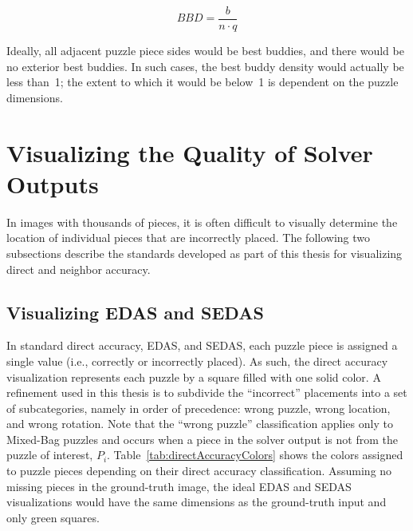 \begin{equation} \label{eq:bestBuddyDensity}
    BBD = \frac{b}{n \cdot q}
\end{equation}

Ideally, all adjacent puzzle piece sides would be best buddies, and there would be no exterior best buddies. In such cases, the best buddy density would actually be less than~1; the extent to which it would be below~1 is dependent on the puzzle dimensions. 

\section{Visualizing the Quality of Solver Outputs}\label{sec:visualizingSolverAccuracy}

In images with thousands of pieces, it is often difficult to visually determine the location of individual pieces that are incorrectly placed.  The following two subsections describe the standards developed as part of this thesis for visualizing direct and neighbor accuracy.

\subsection{Visualizing EDAS and SEDAS}\label{sec:visualizingEdasSedas}

In standard direct accuracy, EDAS, and SEDAS, each puzzle piece is assigned a single value (i.e., correctly or incorrectly placed).  As such, the direct accuracy visualization represents each puzzle by a square filled with one solid color.  A refinement used in this thesis is to subdivide the ``incorrect'' placements into a set of subcategories, namely in order of precedence: wrong puzzle, wrong location, and wrong rotation.  Note that the ``wrong puzzle'' classification applies only to Mixed-Bag puzzles and occurs when a piece in the solver output is not from the puzzle of interest, $P_i$.  Table~\ref{tab:directAccuracyColors} shows the colors assigned to puzzle pieces depending on their direct accuracy classification.  Assuming no missing pieces in the ground-truth image, the ideal EDAS and SEDAS visualizations would have the same dimensions as the ground-truth input and only green squares.


